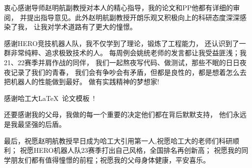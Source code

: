 \begin{acknowledgements}
衷心感谢导师赵明航副教授对本人的精心指导，我的论文和PP他都有详细的审阅，
并提出指导意见。此外赵明航副教授开朗乐观又积极向上的科研态度深深感染了我，
让我对学术道路有了更大的憧憬。
\par
感谢HERO竞技机器人队，我不仅学到了理论，锻炼了工程能力，
还认识到了一群非常纯粹、追求极致技术的人。
每周例会姚统老师的发言都让我受益匪浅；我21、22赛季并肩作战的同伴，
我们一起熬夜写代码、做测试，那些不眠的日日夜夜记录了我们的青春，
我们会有争吵会有矛盾，但都是良性的，都是想着怎么去把机器人的性能做到最好。
做有实践精神的梦想家!

\par
感谢哈工大\LaTeX\ 论文模板\hithesis\ !


\par
还要感谢我的父母，我做的每一个重要的决定他们都在背后默默支持，
他们永远是我最坚强的后盾。
\par
最后，祝愿赵明航教授早日成为哈工大引用第一人,祝愿哈工大的老师们科研顺利；
祝愿HERO机器人队23赛季打出自己风格，全国排名再创新高；
祝愿我的同学朋友们都有值得憧憬的前程；祝愿我的父母身体健康，平安喜乐。
\end{acknowledgements}
